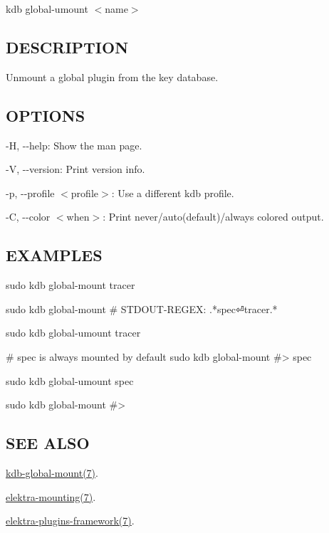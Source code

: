 {\ttfamily kdb global-\/umount $<$name$>$}

\subsection*{D\+E\+S\+C\+R\+I\+P\+T\+I\+ON}

Unmount a global plugin from the key database.

\subsection*{O\+P\+T\+I\+O\+NS}


\begin{DoxyItemize}
\item {\ttfamily -\/H}, {\ttfamily -\/-\/help}\+: Show the man page.
\item {\ttfamily -\/V}, {\ttfamily -\/-\/version}\+: Print version info.
\item {\ttfamily -\/p}, {\ttfamily -\/-\/profile $<$profile$>$}\+: Use a different kdb profile.
\item {\ttfamily -\/C}, {\ttfamily -\/-\/color $<$when$>$}\+: Print never/auto(default)/always colored output.
\end{DoxyItemize}

\subsection*{E\+X\+A\+M\+P\+L\+ES}


\begin{DoxyCode}
sudo kdb global-mount tracer

sudo kdb global-mount
# STDOUT-REGEX: .*spec⏎tracer.*

sudo kdb global-umount tracer

# spec is always mounted by default
sudo kdb global-mount
#> spec

sudo kdb global-umount spec

sudo kdb global-mount
#>
\end{DoxyCode}


\subsection*{S\+EE A\+L\+SO}


\begin{DoxyItemize}
\item \hyperlink{md_doc_help_kdb-global-mount_doc_help_kdb-global-mount_md}{kdb-\/global-\/mount(7)}.
\item \hyperlink{md_doc_help_elektra-mounting_doc_help_elektra-mounting_md}{elektra-\/mounting(7)}.
\item \hyperlink{doc_dev_plugins-framework_md}{elektra-\/plugins-\/framework(7)}. 
\end{DoxyItemize}